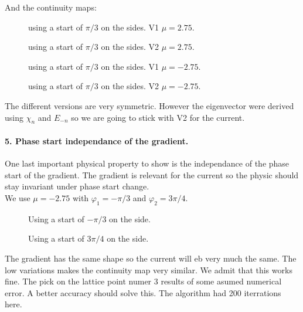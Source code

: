 \documentclass[../main.tex]{subfiles}
\begin{document}
And the continuity maps:
\begin{figure}[H]
    \centering
    
    \caption{using a start of $\pi/3$ on the sides. V1 $\mu = 2.75$.}
\end{figure}
\begin{figure}[H]
    \centering
    
    \caption{using a start of $\pi/3$ on the sides. V2 $\mu = 2.75$.}
\end{figure}

\begin{figure}[H]
    \centering
    
    \caption{using a start of $\pi/3$ on the sides. V1 $\mu = -2.75$.}
\end{figure}
\begin{figure}[H]
    \centering
    
    \caption{using a start of $\pi/3$ on the sides. V2 $\mu = -2.75$.}
\end{figure}

The different versions are very symmetric. However the eigenvector were derived using $\chi_n$ and $E_{-n}$ so we are going to stick with V2 for the current. 

\paragraph{5. Phase start independance of the gradient.}$~$\\
One last important physical property to show is the independance of the phase start of the gradient. The gradient is relevant for the current so the physic 
should stay invariant under phase start change.\\

We use $\mu = -2.75$ with $\varphi_1 = -\pi/3$ and $\varphi_2 = 3\pi/4$.
\begin{figure}[H]
    \centering
    
    \caption{Using a start of $-\pi/3$ on the side.}
\end{figure}
\begin{figure}[H]
    \centering
    
    \caption{Using a start of $3\pi/4$ on the side.}
\end{figure}
The gradient has the same shape so the current will eb very much the same. The low variations makes the 
continuity map very similar. We admit that this works fine. The pick on the lattice point numer 3 results 
of some asumed numerical error. A better accuracy should solve this. The algorithm had 200 iterrations here.\\ 
\end{document}
